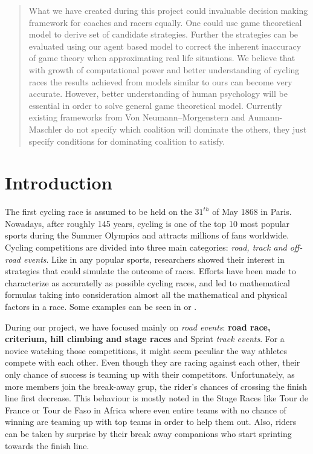 \documentclass[10pt, a4paper]{report}
\begin{document}
\begin{abstract}
What we have created during this project could invaluable decision making framework for coaches and racers equally. One could use game theoretical model to derive set of candidate strategies. Further the strategies can be evaluated using our agent based model to correct the inherent inaccuracy of game theory when approximating real life situations. We believe that with growth of computational power and better understanding of cycling races the results achieved from models similar to ours can become very accurate. However, better understanding of human psychology will be essential in order to solve general game theoretical model. Currently existing frameworks from Von Neumann–Morgenstern and Aumann-Maschler do not specify which coalition will dominate the others, they just specify conditions for dominating coalition to satisfy.

\end{abstract}


\chapter{Introduction}\label{ch:intro}

The first cycling race is assumed to be held on the $31^{th}$ of May 1868 in Paris. Nowadays, after roughly 145 years, cycling is one of the top 10 most popular sports during the Summer Olympics \cite{TopEndSportsUrl} and attracts millions of fans worldwide. Cycling competitions are divided into three main categories: \textit{road, track and off-road events}. Like in any popular sports, researchers showed their interest in strategies that could simulate the outcome of races. Efforts have been made to characterize as accuratelly as possible cycling races, and led to mathematical formulas taking into consideration almost all the mathematical and physical factors in a race. Some examples can be seen in \cite{AgentModel} or \cite{SlipStream} .

During our project, we have focused mainly on \textit{road events}: \textbf{road race, criterium, hill climbing and stage races} and Sprint \textit{track events}. For a novice watching those competitions, it might seem peculiar the way athletes compete with each other. Even though they are racing against each other, their only chance of success is teaming up with their competitors. Unfortunately, as more members join the break-away grup, the rider's chances of crossing the finish line first decrease. This behaviour is mostly noted in the Stage Races like Tour de France or Tour de Faso in Africa where even entire teams with no chance of winning are teaming up with top teams in order to help them out. Also, riders can be taken by surprise by their break away companions who start sprinting towards the finish line.
\end{document}
